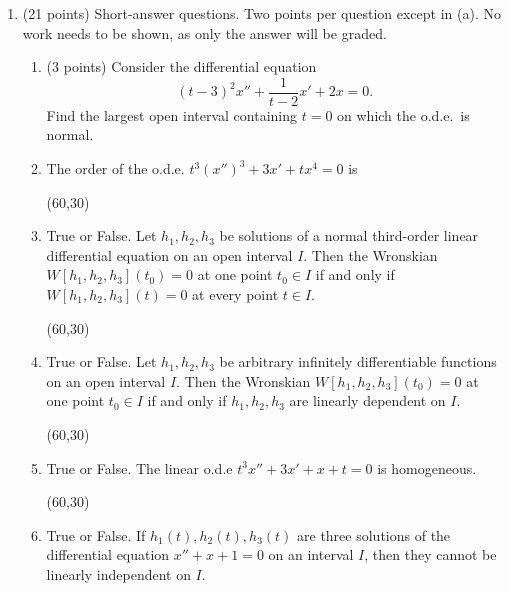 \documentclass[12pt]{article}
\begin{document}
\begin{enumerate}
 \setlength{\itemsep}{5mm}


\item (21 points) Short-answer questions.  Two points per question
  except in (a).  No work needs to be shown, as only the answer will be graded.

  \begin{enumerate}
    \setlength{\itemsep}{5mm}


    \item (3 points) Consider the differential equation
      \[
        (t-3)^2 x'' + \frac{1}{t-2} x' + 2x = 0.
        \]
        Find the largest open interval containing $t=0$ on which the
        o.d.e.\ is normal.
        
        \hfill {}

         \item The order of the o.d.e. $t^3 (x'')^3 + 3x' +tx^4 = 0$ is

      \hfill \framebox(60,30){}


        \item  True or False.  Let $h_1, h_2, h_3$ be solutions of a normal
          third-order linear differential equation on an open
      interval $I$.  Then the Wronskian $W[h_1, h_2, h_3](t_0) = 0$
      at one point $t_0 \in I$ if and only if $W[h_1, h_2, h_3](t)
      =0$ at every point $t \in I$.

      \hfill \framebox(60,30){}

      \item True or False.  Let $h_1, h_2, h_3$ be arbitrary infinitely differentiable
        functions on an open interval $I$.  Then the Wronskian $W[h_1, h_2, h_3](t_0) = 0$
      at one point $t_0 \in I$ if and only if $h_1, h_2, h_3$
      are linearly dependent on $I$.

      \hfill \framebox(60,30){}

           \item True or False.  The linear o.d.e $t^3 x'' + 3x' + x + t
          = 0$ is homogeneous.

          \hfill \framebox(60,30){}

          


            \item True or False.  If $h_1(t), h_2(t), h_3(t)$ are
              three solutions of the differential equation $x'' + x +
              1 = 0$ on an interval $I$, then they cannot be
              linearly independent on $I$.


\end{enumerate}
\end{enumerate}
\end{document}
